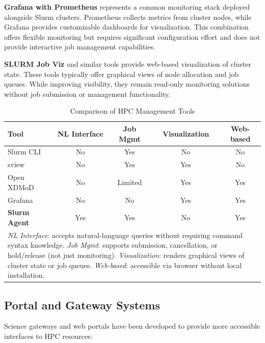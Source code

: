 \textbf{Grafana with Prometheus} represents a common monitoring stack deployed alongside Slurm clusters. Prometheus collects metrics from cluster nodes, while Grafana provides customizable dashboards for visualization. This combination offers flexible monitoring but requires significant configuration effort and does not provide interactive job management capabilities.

\textbf{SLURM Job Viz} and similar tools provide web-based visualization of cluster state. These tools typically offer graphical views of node allocation and job queues. While improving visibility, they remain read-only monitoring solutions without job submission or management functionality.

\begin{table}[H]
    \centering
    \caption{Comparison of HPC Management Tools}
    \label{tab:hpc-tools}
    \begin{tabular}{|l|c|c|c|c|}
        \hline
        \textbf{Tool} & \textbf{NL Interface} & \textbf{Job Mgmt} & \textbf{Visualization} & \textbf{Web-based} \\
        \hline
        Slurm CLI & No & Yes & No & No \\
        sview & No & Yes & Yes & No \\
        Open XDMoD & No & Limited & Yes & Yes \\
        Grafana & No & No & Yes & Yes \\
        \textbf{Slurm Agent} & Yes & Yes & No & Yes \\
        \hline
        \multicolumn{5}{|p{\dimexpr\linewidth-2\tabcolsep-2\arrayrulewidth}|}{\footnotesize\textit{NL Interface}: accepts natural-language queries without requiring command syntax knowledge. \textit{Job Mgmt}: supports submission, cancellation, or hold/release (not just monitoring). \textit{Visualization}: renders graphical views of cluster state or job queues. \textit{Web-based}: accessible via browser without local installation.} \\
        \hline
    \end{tabular}
\end{table}


\subsection{Portal and Gateway Systems}

Science gateways and web portals have been developed to provide more accessible interfaces to HPC resources:

